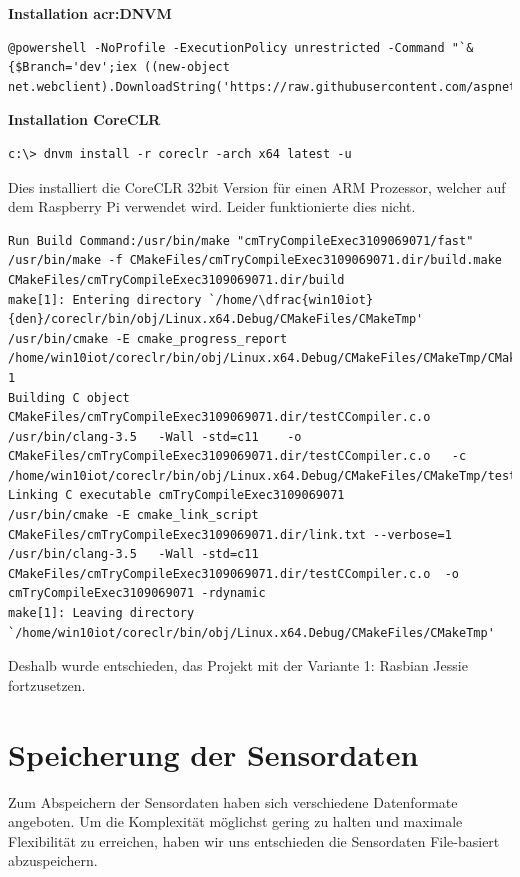 \textbf{Installation \gls{acr:DNVM}} \\
\begin{lstlisting}
@powershell -NoProfile -ExecutionPolicy unrestricted -Command "`&{$Branch='dev';iex ((new-object net.webclient).DownloadString('https://raw.githubusercontent.com/aspnet/Home/dev/dnvminstall.ps1'))}"'
\end{lstlisting}

\textbf{Installation CoreCLR} \\
\begin{lstlisting}
c:\> dnvm install -r coreclr -arch x64 latest -u
\end{lstlisting}
Dies installiert die CoreCLR 32bit Version für einen ARM Prozessor, welcher auf dem Raspberry Pi verwendet wird. Leider funktionierte dies nicht. 

\begin{lstlisting}
Run Build Command:/usr/bin/make "cmTryCompileExec3109069071/fast"
/usr/bin/make -f CMakeFiles/cmTryCompileExec3109069071.dir/build.make CMakeFiles/cmTryCompileExec3109069071.dir/build
make[1]: Entering directory `/home/\dfrac{win10iot}{den}/coreclr/bin/obj/Linux.x64.Debug/CMakeFiles/CMakeTmp'
/usr/bin/cmake -E cmake_progress_report /home/win10iot/coreclr/bin/obj/Linux.x64.Debug/CMakeFiles/CMakeTmp/CMakeFiles 1
Building C object CMakeFiles/cmTryCompileExec3109069071.dir/testCCompiler.c.o
/usr/bin/clang-3.5   -Wall -std=c11    -o CMakeFiles/cmTryCompileExec3109069071.dir/testCCompiler.c.o   -c /home/win10iot/coreclr/bin/obj/Linux.x64.Debug/CMakeFiles/CMakeTmp/testCCompiler.c
Linking C executable cmTryCompileExec3109069071
/usr/bin/cmake -E cmake_link_script CMakeFiles/cmTryCompileExec3109069071.dir/link.txt --verbose=1
/usr/bin/clang-3.5   -Wall -std=c11     CMakeFiles/cmTryCompileExec3109069071.dir/testCCompiler.c.o  -o cmTryCompileExec3109069071 -rdynamic 
make[1]: Leaving directory `/home/win10iot/coreclr/bin/obj/Linux.x64.Debug/CMakeFiles/CMakeTmp'
\end{lstlisting}

Deshalb wurde entschieden, das Projekt mit der Variante 1: Rasbian Jessie fortzusetzen.

\section{Speicherung der Sensordaten}
Zum Abspeichern der Sensordaten haben sich verschiedene Datenformate angeboten. Um die Komplexität möglichst gering zu halten und maximale Flexibilität zu erreichen, haben wir uns entschieden die Sensordaten File-basiert abzuspeichern.

